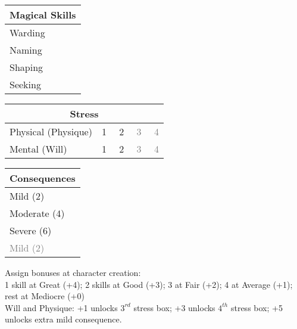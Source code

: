 \documentclass[12pt,a4paper]{article}
\newcommand{\MyTextField}[2][]{%
  \TextField[borderwidth=0,backgroundcolor={},#1]{#2}%
}
\begin{document}
\begin{minipage}{0.45\linewidth}
\begin{tabular}{|l|p{2cm}|}
\hline
\multicolumn{2}{|c|}{\textbf{Magical Skills}} \\ \hline
Warding & \MyTextField[name=Warding,width=\linewidth]{} \\ \hline
Naming & \MyTextField[name=Naming,width=\linewidth]{}\\ \hline
Shaping & \MyTextField[name=Shaping,width=\linewidth]{}\\ \hline
Seeking & \MyTextField[name=Seeking,width=\linewidth]{}\\ \hline
\end{tabular}

\vspace{0.5cm}

\begin{tabular}{|l|l|}
\hline
\multicolumn{2}{|c|}{\textbf{Stress}} \\ \hline
Physical (Physique) & 1 \ \ 2 \ \ \textcolor{gray}{3} \ \ \textcolor{gray}{4} \\ \hline
Mental (Will) & 1 \ \ 2 \ \ \textcolor{gray}{3} \ \ \textcolor{gray}{4} \\ \hline
\end{tabular}

\vspace{0.5cm}

\begin{tabular}{|l|m{5cm}|}
\hline
\multicolumn{2}{|c|}{\textbf{Consequences}} \\ \hline 
Mild (2) & \MyTextField[name=ConsequenceMild,width=\linewidth]{}\\ \hline
Moderate (4) & \MyTextField[name=ConsequenceModerate,width=\linewidth]{}\\ \hline
Severe (6) & \MyTextField[name=ConsequenceSevere,width=\linewidth]{}\\ \hline
\textcolor{gray}{Mild (2)} & \MyTextField[name=ConsequenceMildExtra,width=\linewidth]{}\\ \hline
\end{tabular}
\end{minipage}

\vspace{0.5em}

{\small Assign bonuses at character creation: \\ 
1 skill at Great (+4); 2 skills at Good (+3); 3 at Fair (+2); 4 at Average (+1); rest at Mediocre (+0)\\
Will and Physique: +1 unlocks $3^{rd}$ stress box; +3 unlocks $4^{th}$ stress box; +5 unlocks extra mild consequence.}
\end{document}
